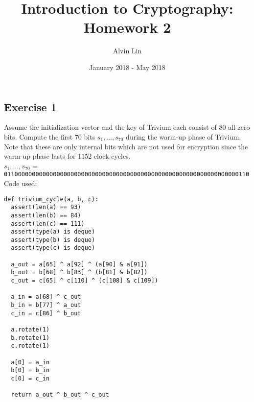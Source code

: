 \documentclass{math}
\title{Introduction to Cryptography: Homework 2}
\author{Alvin Lin}
\date{January 2018 - May 2018}
\begin{document}
\maketitle

\subsection*{Exercise 1}
Assume the initialization vector and the key of Trivium each consist of 80
all-zero bits. Compute the first 70 bits \( s_1,\dots,s_{70} \) during the
warm-up phase of Trivium. Note that these are only internal bits which are
not used for encryption since the warm-up phase lasts for 1152 clock cycles. \\
\( s_1, \dots, s_{70} \) =
{\tt 0110000000000000000000000000000000000000000000000000000000000000000110} \\
Code used:
\begin{lstlisting}
def trivium_cycle(a, b, c):
  assert(len(a) == 93)
  assert(len(b) == 84)
  assert(len(c) == 111)
  assert(type(a) is deque)
  assert(type(b) is deque)
  assert(type(c) is deque)

  a_out = a[65] ^ a[92] ^ (a[90] & a[91])
  b_out = b[68] ^ b[83] ^ (b[81] & b[82])
  c_out = c[65] ^ c[110] ^ (c[108] & c[109])

  a_in = a[68] ^ c_out
  b_in = b[77] ^ a_out
  c_in = c[86] ^ b_out

  a.rotate(1)
  b.rotate(1)
  c.rotate(1)

  a[0] = a_in
  b[0] = b_in
  c[0] = c_in

  return a_out ^ b_out ^ c_out
\end{lstlisting}
\end{document}
